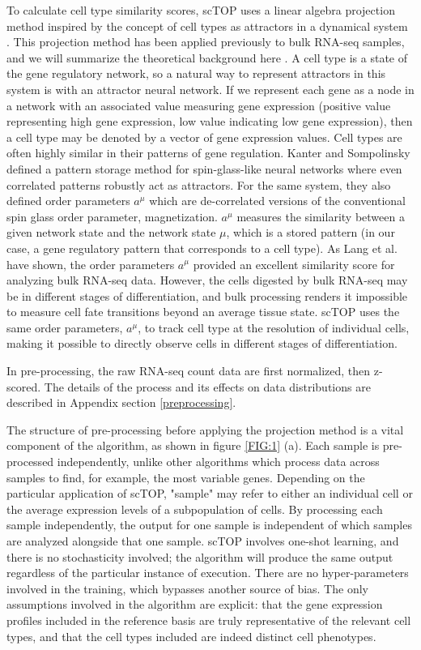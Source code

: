 \documentclass[aps,superscriptaddress, notitlepage,longbibliography]{revtex4-1}
\begin{document}
To calculate cell type similarity scores, scTOP uses a linear algebra projection method inspired by the concept of cell types as attractors in a dynamical system \cite{huang_cell_2005}. This projection method has been applied previously to bulk RNA-seq samples, and we will summarize the theoretical background here \cite{lang_epigenetic_2014}. A cell type is a state of the gene regulatory network, so a natural way to represent attractors in this system is with an attractor neural network. If we represent each gene as a node in a network with an associated value measuring gene expression (positive value representing high gene expression, low value indicating low gene expression), then a cell type may be denoted by a vector of gene expression values. Cell types are often highly similar in their patterns of gene regulation. Kanter and Sompolinsky \cite{kanter_associative_1987} defined a pattern storage method for spin-glass-like neural networks where even correlated patterns robustly act as attractors. For the same system, they also defined order parameters $a^{\mu}$ which are de-correlated versions of the conventional spin glass order parameter, magnetization. $a^{\mu}$ measures the similarity between a given network state and the network state $\mu$, which is a stored pattern (in our case, a gene regulatory pattern that corresponds to a cell type). As Lang et al. have shown, the order parameters $a^{\mu}$ provided an excellent similarity score for analyzing bulk RNA-seq data. However, the cells digested by bulk RNA-seq may be in different stages of differentiation, and bulk processing renders it impossible to measure cell fate transitions beyond an average tissue state. scTOP uses the same order parameters, $a^{\mu}$, to track cell type at the resolution of individual cells, making it possible to directly observe cells in different stages of differentiation.

In pre-processing, the raw RNA-seq count data are first normalized, then z-scored. The details of the process and its effects on data distributions are described in Appendix section \ref{preprocessing}.

The structure of pre-processing before applying the projection method is a vital component of the algorithm, as shown in figure \ref{FIG:1} (a). Each sample is pre-processed independently, unlike other algorithms which process data across samples to find, for example, the most variable genes. Depending on the particular application of scTOP, "sample" may refer to either an individual cell or the average expression levels of a subpopulation of cells. By processing each sample independently, the output for one sample is independent of which samples are analyzed alongside that one sample. scTOP involves one-shot learning, and there is no stochasticity involved; the algorithm will produce the same output regardless of the particular instance of execution. There are no hyper-parameters involved in the training, which bypasses another source of bias. The only assumptions involved in the algorithm are explicit: that the gene expression profiles included in the reference basis are truly representative of the relevant cell types, and that the cell types included are indeed distinct cell phenotypes.
\end{document}
